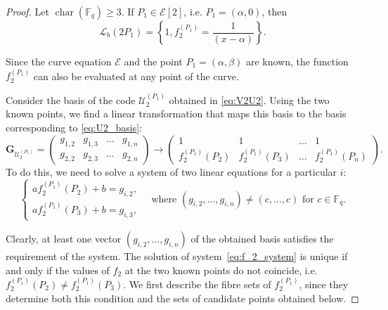 \documentclass[sn-mathphys-num]{sn-jnl_modified}
\begin{document}
\begin{proof}
Let $\operatorname{char}(\mathbb{F}_q) \geq 3$. If $P_1 \in \mathcal{E}[2]$, i.e. $P_1 = (\alpha, 0)$, then
\[
\mathscr{L}_b(2P_1) = \left\{1, f_2^{(P_1)} = \frac{1}{(x-\alpha)}\right\}.
\]

Since the curve equation $\mathcal{E}$ and the point $P_1 = (\alpha, \beta)$ are known, the function $f_2^{(P_1)}$ can also be evaluated at any point of the curve.

Consider the basis of the code $\mathcal{U}_2^{(P_1)}$ obtained in \eqref{eq:V2U2}. Using the two known points, we find a linear transformation that maps this basis to the basis corresponding to \eqref{eq:U2_basis}:
\[
\mathbf{G}_{\mathcal{U}_2^{(P_1)}} = 
\begin{pmatrix}
g_{1,2} & g_{1, 3} & \dots & g_{1, n}\\
g_{2,2} & g_{2, 3} & \dots & g_{2, n}
\end{pmatrix} \longrightarrow 
\begin{pmatrix}
1 & 1 & \dots & 1\\
f_2^{(P_1)}(P_2) & f_2^{(P_1)}(P_3) & \dots & f_2^{(P_1)}(P_n) 
\end{pmatrix}.
\]
To do this, we need to solve a system of two linear equations for a particular $i$:
\begin{equation}\label{eq:f_2_system}
\begin{cases}
a f_2^{(P_1)}(P_2) + b = g_{i,2},\\
a f_2^{(P_1)}(P_3) + b = g_{i,3},
\end{cases}
\quad \text{where } (g_{i, 2}, \dots, g_{i, n}) \neq (c, \dots, c) \text{ for } c\in \mathbb{F}_q.
\end{equation}













Clearly, at least one vector $(g_{i,2}, \dots, g_{i,n})$ of the obtained basis satisfies the requirement of the system. The solution of system~\eqref{eq:f_2_system} is unique if and only if the values of $f_2$ at the two known points do not coincide, i.e. $f_2^{(P_1)}(P_2) \neq f_2^{(P_1)}(P_3)$. We first describe the fibre sets of $f_2^{(P_1)}$, since they determine both this condition and the sets of candidate points obtained below.


\end{proof}
\end{document}
